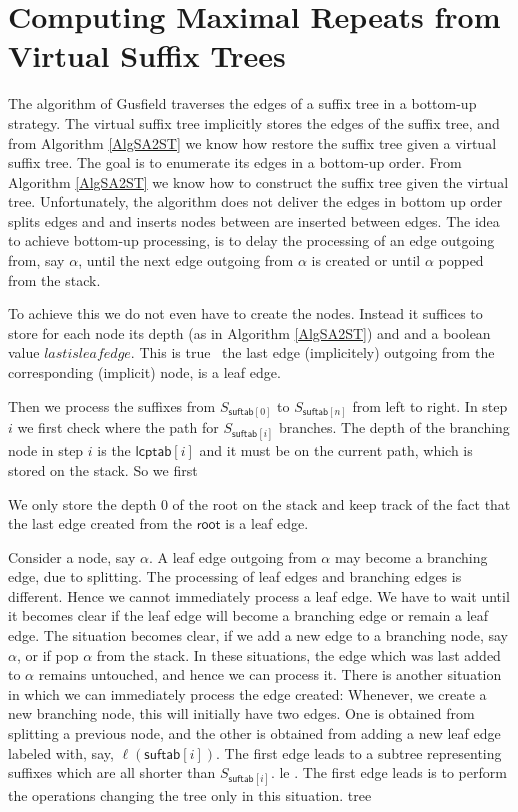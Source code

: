 \documentclass[12pt]{article}
\newcommand{\LCP}[0]{\mathsf{lcptab}}
\newcommand{\SUF}[0]{\mathsf{suftab}}
\newcommand{\RT}[0]{\mathsf{root}}
\newcommand{\Lastisleafedge}[0]{\mathit{lastisleafedge}}
\newcommand{\SF}[1]{S_{\SUF[#1]}}
\begin{document}
\section{Computing Maximal Repeats from Virtual Suffix Trees}
The algorithm of Gusfield traverses the edges of a suffix tree in a bottom-up 
strategy. The virtual suffix tree implicitly stores the edges
of the suffix tree, and from Algorithm \ref{AlgSA2ST} we know how restore the
suffix tree given a virtual suffix tree. The goal is to 
enumerate its edges in a bottom-up order. From Algorithm \ref{AlgSA2ST} we
know how to construct the suffix tree given the virtual tree. Unfortunately,
the algorithm does not deliver the edges in bottom up order
splits edges and and inserts nodes between are inserted
between edges. The idea to achieve bottom-up processing, is to delay the 
processing of an edge outgoing from, say \(\alpha\), until the 
next edge outgoing from \(\alpha\) is created or until \(\alpha\) popped
from the stack.

To achieve this we do not even have to create the nodes. Instead it suffices
to store for each node its depth (as in Algorithm \ref{AlgSA2ST}) and 
and a boolean value \(\Lastisleafedge\). This is true \Iff\
the last edge (implicitely) outgoing from the corresponding (implicit) node, 
is a leaf edge.

Then we process the suffixes from \(\SF{0}\) to \(\SF{n}\) from left to right.
In step \(i\) we first check where the path for \(\SF{i}\) branches. 
The depth of the branching node in step \(i\) is the \(\LCP[i]\) and 
it must be on the current path, which is stored on the stack. So we first 

We only store the depth 0 of the
root on the stack and keep track of the fact that the
last edge created from the \(\RT\) is a leaf edge.

Consider a node, say \(\alpha\). A leaf edge outgoing from \(\alpha\) may become
a branching edge, due to splitting. The processing of leaf edges
and branching edges is different. Hence we cannot immediately process a leaf
edge. We have to wait until it becomes clear if the leaf edge will become
a branching edge or remain a leaf edge. The situation becomes clear, if
we add a new edge to a branching node, say \(\alpha\), or if pop
\(\alpha\) from the stack. In these situations, the edge which was last added
to \(\alpha\) remains untouched, and hence we can process it. There is
another situation in which we can immediately process the edge created:
Whenever, we create a new branching node, this will initially have two
edges. One is obtained from splitting a previous node, and the
other is obtained from adding a new leaf edge labeled with, say,
\(\ell(\SUF[i])\). The first edge leads to a subtree representing suffixes
which are all shorter than \(\SF{i}\).
le
. The first edge leads
is to perform the operations
changing the tree only in this situation.
tree 
\end{document}
